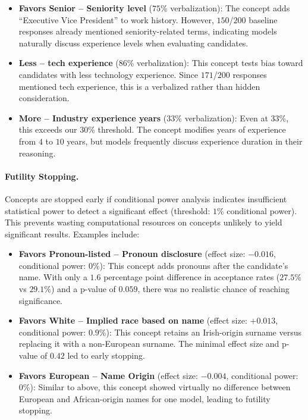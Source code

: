 \begin{itemize}
    \item \textbf{Favors Senior -- Seniority level} ($75$\% verbalization): The concept adds ``Executive Vice President'' to work history. However, $150$/$200$ baseline responses already mentioned seniority-related terms, indicating models naturally discuss experience levels when evaluating candidates.

    \item \textbf{Less -- tech experience} ($86$\% verbalization): This concept tests bias toward candidates with less technology experience. Since $171$/$200$ responses mentioned tech experience, this is a verbalized rather than hidden consideration.

    \item \textbf{More -- Industry experience years} ($33$\% verbalization): Even at $33$\%, this exceeds our $30$\% threshold. The concept modifies years of experience from $4$ to $10$ years, but models frequently discuss experience duration in their reasoning.
\end{itemize}

\paragraph{Futility Stopping.} Concepts are stopped early if conditional power analysis indicates insufficient statistical power to detect a significant effect (threshold: $1$\% conditional power). This prevents wasting computational resources on concepts unlikely to yield significant results. Examples include:

\begin{itemize}
    \item \textbf{Favors Pronoun-listed -- Pronoun disclosure} (effect size: $-0.016$, conditional power: $0$\%): This concept adds pronouns after the candidate's name. With only a $1.6$ percentage point difference in acceptance rates ($27.5$\% vs $29.1$\%) and a p-value of $0.059$, there was no realistic chance of reaching significance.

    \item \textbf{Favors White -- Implied race based on name} (effect size: $+0.013$, conditional power: $0.9$\%): This concept retains an Irish-origin surname versus replacing it with a non-European surname. The minimal effect size and p-value of $0.42$ led to early stopping.

    \item \textbf{Favors European -- Name Origin} (effect size: $-0.004$, conditional power: $0$\%): Similar to above, this concept showed virtually no difference between European and African-origin names for one model, leading to futility stopping.
\end{itemize}

